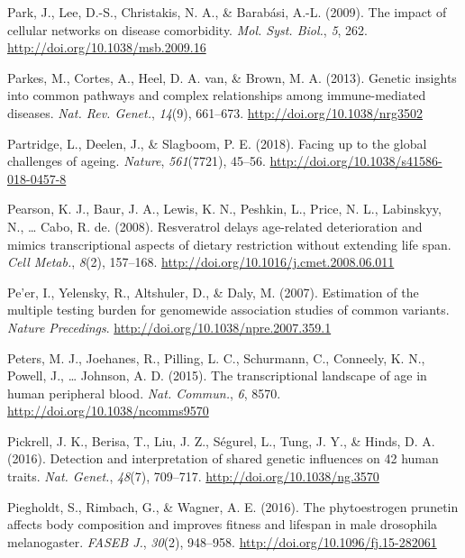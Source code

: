\documentclass[12pt,twoside]{unicam}
\begin{document}
\begin{cslreferences}
\leavevmode\hypertarget{ref-Park2009}{}%
Park, J., Lee, D.-S., Christakis, N. A., \& Barabási, A.-L. (2009). The impact of cellular networks on disease comorbidity. \emph{Mol. Syst. Biol.}, \emph{5}, 262. \url{http://doi.org/10.1038/msb.2009.16}

\leavevmode\hypertarget{ref-Parkes2013}{}%
Parkes, M., Cortes, A., Heel, D. A. van, \& Brown, M. A. (2013). Genetic insights into common pathways and complex relationships among immune-mediated diseases. \emph{Nat. Rev. Genet.}, \emph{14}(9), 661--673. \url{http://doi.org/10.1038/nrg3502}

\leavevmode\hypertarget{ref-Partridge2018}{}%
Partridge, L., Deelen, J., \& Slagboom, P. E. (2018). Facing up to the global challenges of ageing. \emph{Nature}, \emph{561}(7721), 45--56. \url{http://doi.org/10.1038/s41586-018-0457-8}

\leavevmode\hypertarget{ref-Pearson2008}{}%
Pearson, K. J., Baur, J. A., Lewis, K. N., Peshkin, L., Price, N. L., Labinskyy, N., \ldots{} Cabo, R. de. (2008). Resveratrol delays age-related deterioration and mimics transcriptional aspects of dietary restriction without extending life span. \emph{Cell Metab.}, \emph{8}(2), 157--168. \url{http://doi.org/10.1016/j.cmet.2008.06.011}

\leavevmode\hypertarget{ref-Peer2007}{}%
Pe'er, I., Yelensky, R., Altshuler, D., \& Daly, M. (2007). Estimation of the multiple testing burden for genomewide association studies of common variants. \emph{Nature Precedings}. \url{http://doi.org/10.1038/npre.2007.359.1}

\leavevmode\hypertarget{ref-Peters2015}{}%
Peters, M. J., Joehanes, R., Pilling, L. C., Schurmann, C., Conneely, K. N., Powell, J., \ldots{} Johnson, A. D. (2015). The transcriptional landscape of age in human peripheral blood. \emph{Nat. Commun.}, \emph{6}, 8570. \url{http://doi.org/10.1038/ncomms9570}

\leavevmode\hypertarget{ref-Pickrell2016}{}%
Pickrell, J. K., Berisa, T., Liu, J. Z., Ségurel, L., Tung, J. Y., \& Hinds, D. A. (2016). Detection and interpretation of shared genetic influences on 42 human traits. \emph{Nat. Genet.}, \emph{48}(7), 709--717. \url{http://doi.org/10.1038/ng.3570}

\leavevmode\hypertarget{ref-Piegholdt2016}{}%
Piegholdt, S., Rimbach, G., \& Wagner, A. E. (2016). The phytoestrogen prunetin affects body composition and improves fitness and lifespan in male drosophila melanogaster. \emph{FASEB J.}, \emph{30}(2), 948--958. \url{http://doi.org/10.1096/fj.15-282061}


\end{cslreferences}
\end{document}

